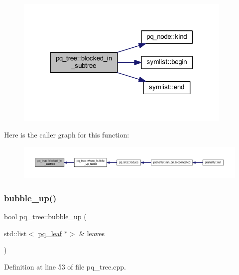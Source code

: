 \begin{figure}[H]
\begin{center}
\leavevmode
\includegraphics[width=294pt]{classpq__tree_a6ce932de3106ad6c9d84bb2058784b0a_cgraph}
\end{center}
\end{figure}
Here is the caller graph for this function\+:\nopagebreak
\begin{figure}[H]
\begin{center}
\leavevmode
\includegraphics[width=350pt]{classpq__tree_a6ce932de3106ad6c9d84bb2058784b0a_icgraph}
\end{center}
\end{figure}
\mbox{\label{classpq__tree_a109cb910dcb75d3e196a46f5174406c7}} 
\subsubsection{\texorpdfstring{bubble\+\_\+up()}{bubble\_up()}}
{\footnotesize\ttfamily bool pq\+\_\+tree\+::bubble\+\_\+up (\begin{DoxyParamCaption}\item[{std\+::list$<$ \mbox{\hyperlink{classpq__leaf}{pq\+\_\+leaf}} $\ast$$>$ \&}]{leaves }\end{DoxyParamCaption})\hspace{0.3cm}{\ttfamily [private]}}



Definition at line 53 of file pq\+\_\+tree.\+cpp.


